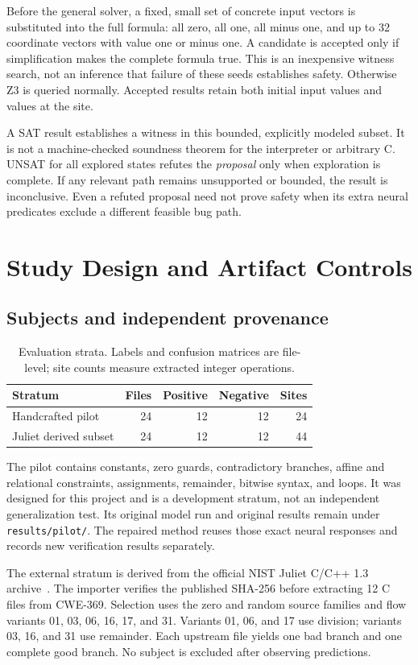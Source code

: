 \documentclass[sigconf]{acmart}
\begin{document}
Before the general solver, a fixed, small set of concrete input vectors is
substituted into the full formula: all zero, all one, all minus one, and up to
32 coordinate vectors with value one or minus one. A candidate is accepted
only if simplification makes the complete formula true. This is an inexpensive
witness search, not an inference that failure of these seeds establishes
safety. Otherwise Z3 is queried normally. Accepted results retain both initial
input values and values at the site.

A SAT result establishes a witness in this bounded, explicitly modeled subset.
It is not a machine-checked soundness theorem for the interpreter or arbitrary
C. UNSAT for all explored states refutes the \emph{proposal} only when
exploration is complete. If any relevant path remains unsupported or bounded,
the result is inconclusive. Even a refuted proposal need not prove safety when
its extra neural predicates exclude a different feasible bug path.

\section{Study Design and Artifact Controls}
\subsection{Subjects and independent provenance}
\begin{table}[t]
\caption{Evaluation strata. Labels and confusion matrices are file-level;
site counts measure extracted integer operations.}
\label{tab:subjects}
\centering\small
\begin{tabular}{lrrrr}\toprule
Stratum & Files & Positive & Negative & Sites\\\midrule
Handcrafted pilot & 24 & 12 & 12 & 24\\
Juliet derived subset & 24 & 12 & 12 & 44\\\bottomrule
\end{tabular}
\end{table}
The pilot contains constants, zero guards, contradictory branches, affine and
relational constraints, assignments, remainder, bitwise syntax, and loops.
It was designed for this project and is a development stratum, not an
independent generalization test. Its original model run and original results
remain under \texttt{results/pilot/}. The repaired method reuses those exact
neural responses and records new verification results separately.

The external stratum is derived from the official NIST Juliet C/C++ 1.3
archive~\cite{juliet}. The importer verifies the published SHA-256 before
extracting 12 C files from CWE-369. Selection uses the zero and random source
families and flow variants 01, 03, 06, 16, 17, and 31. Variants 01, 06, and 17
use division; variants 03, 16, and 31 use remainder. Each upstream file yields
one bad branch and one complete good branch. No subject is excluded after
observing predictions.
\end{document}
